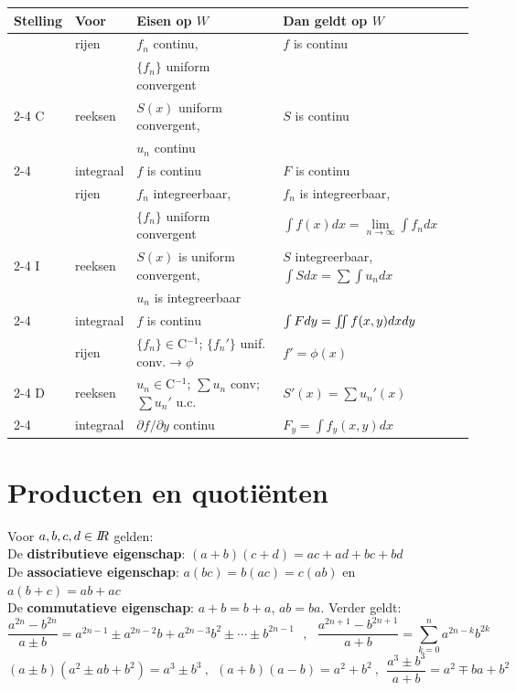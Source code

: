 \documentclass[twoside]{report}
\begin{document}
\begin{center}
\begin{tabular}{||l|l|p{5cm}|p{6cm}||}
\hline
\bf Stelling&\bf Voor&\bf Eisen op $W$&\bf Dan geldt op $W$\\
\hline
\hline
 &rijen    &$f_n$ continu,                              &$f$ is continu\\
 &         &$\{f_n\}$ uniform convergent                &\\
\cline{2-4}
C&reeksen  &$S(x)$ uniform convergent,                  &$S$ is continu\\
 &         &$u_n$ continu                               &\\
\cline{2-4}
 &integraal&$f$ is continu                              &$F$ is continu\\
\hline
 &rijen    &$f_n$ integreerbaar,                        &$f_n$ is integreerbaar,\\
 &         &$\{f_n\}$ uniform convergent                &$\int f(x)dx=\lim\limits_{n\rightarrow\infty}\int f_ndx$\rule[-10pt]{0pt}{0pt}\\
\cline{2-4}
I&reeksen  &$S(x)$ is uniform convergent,               &$S$ integreerbaar, $\int Sdx=\sum\int u_ndx$\rule{0pt}{13pt}\\
 &         &$u_n$ is integreerbaar                      &\\
\cline{2-4}
 &integraal&$f$ is continu                              &$\int Fdy=\int\hspace*{-1.5mm}\int f(x,y)dxdy$\rule{0pt}{13pt}\rule[-8pt]{0pt}{0pt}\\
\hline
 &rijen    &$\{f_n\}\in$C$^{-1}$; $\{f_n'\}$ unif. conv.$\rightarrow\phi$&$f'=\phi(x)$\rule{0pt}{13pt}\rule[-7pt]{0pt}{0pt}\\
\cline{2-4}
D&reeksen  &$u_n\in$C$^{-1}$; $\sum u_n$ conv; $\sum u_n'$ u.c.&$S'(x)=\sum u_n'(x)$\rule{0pt}{13pt}\rule[-7pt]{0pt}{0pt}\\
\cline{2-4}
 &integraal&$\partial f/\partial y$ continu             &$F_y=\int f_y(x,y)dx$\rule{0pt}{13pt}\rule[-7pt]{0pt}{0pt}\\
\hline
\end{tabular}
\end{center}

\section{Producten en quoti\"enten}
Voor $a,b,c,d\in I\hspace{-1mm}R$ gelden:\\
De {\bf distributieve eigenschap}: $(a+b)(c+d)=ac+ad+bc+bd$\\
De {\bf associatieve eigenschap}: $a(bc)=b(ac)=c(ab)$ en $a(b+c)=ab+ac$\\
De {\bf commutatieve eigenschap}: $a+b=b+a$, $ab=ba$.
\npar
Verder geldt:
\[
\frac{a^{2n}-b^{2n}}{a\pm b}=a^{2n-1}\pm a^{2n-2}b+a^{2n-3}b^2\pm\cdots\pm b^{2n-1}~~~,~~~
\frac{a^{2n+1}-b^{2n+1}}{a+b}=\sum_{k=0}^n a^{2n-k}b^{2k}
\]
\[
(a\pm b)(a^2\pm ab+b^2)=a^3\pm b^3~,~~(a+b)(a-b)=a^2+b^2~,~~
\frac{a^3\pm b^3}{a+b}=a^2\mp ba+b^2
\]
\end{document}
